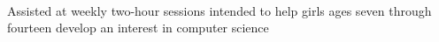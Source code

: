 \documentclass[]{hieudo-build}
\begin{document}
\begin{minipage}[t]{0.64\textwidth}
 \\
\begin{tightemize}
\item Assisted at weekly two-hour sessions intended to help girls ages seven through fourteen develop an interest in computer science 
\end{tightemize}
\sectionsep

 \\
\sectionsep



\end{minipage} 
\end{document}
